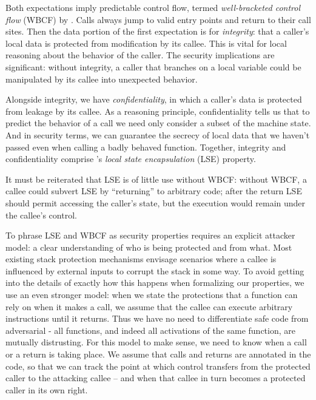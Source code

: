 \documentclass[acmsmall,review,anonymous]{acmart}\settopmatter{printfolios=true,printccs=false,printacmref=false}
\begin{document}

Both expectations imply predictable control flow, termed {\em well-bracketed
control flow} (WBCF) by \citeauthor{Skorstengaard+19}. Calls always jump to valid entry
points and return to their call sites. Then the data portion of the first expectation is for
{\em integrity}: that a caller's local data is protected from modification by its callee.
This is vital for local reasoning about the behavior of the caller. The security implications
are significant: without integrity, a caller that branches on a local variable could be
manipulated by its callee into unexpected behavior.

Alongside integrity, we have {\em confidentiality}, in which a caller's data is protected
from leakage by its callee. As a reasoning principle, confidentiality tells us that to
predict the behavior of a call we need only consider a subset of the machine state.
And in security terms, we can guarantee the secrecy of local data that we haven't passed
even when calling a badly behaved function. Together, integrity and confidentiality
comprise \citeauthor{Skorstengaard+19}'s {\em local state encapsulation} (LSE) property.

It must be reiterated that LSE is of little use without WBCF: without WBCF, a callee
could subvert LSE by ``returning'' to arbitrary code; after the return LSE should permit
accessing the caller's state, but the execution would remain under the callee's control.

To phrase LSE and WBCF as security properties requires an explicit attacker model:
a clear understanding of who is being protected and from what. Most existing
stack protection mechanisms envisage scenarios where a callee is
influenced by external inputs to corrupt the stack in some way. To
avoid getting into the details of exactly how this happens when
formalizing our properties, we use an even stronger model: when we
state the protections that a function can rely on when it makes a
call, we assume that the callee can execute arbitrary instructions
until it returns. Thus we have no need to differentiate safe code
from adversarial - all functions, and indeed all activations of the same function,
are mutually distrusting.
%
For this model to make sense, we need to know when a call or a return is taking
place. We assume that calls and returns are annotated in the code, so that
we can track the point at which control transfers from the protected caller
to the attacking callee -- and when that callee in turn becomes a protected
caller in its own right.
\end{document}
